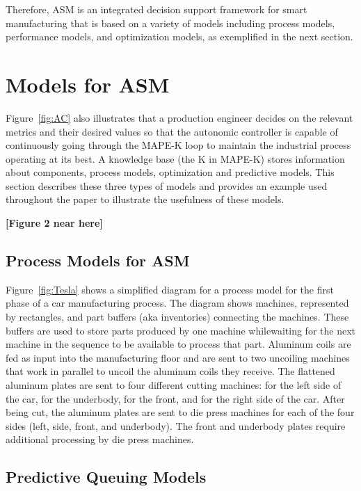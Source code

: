 \documentclass[a4paper, 12pt]{article} %
\begin{document}
Therefore, ASM is an integrated decision support framework for smart manufacturing that is based on a variety of models including process models, performance models, and optimization models, as exemplified in the next section.


\section{Models for ASM} \label{sec:models}

Figure~\ref{fig:AC} also illustrates that a production engineer decides on the relevant metrics and their desired values so that the autonomic controller is capable of continuously going through the MAPE-K loop to maintain the industrial process operating at its best. A knowledge base (the K in MAPE-K) stores information about components, process models, optimization and predictive models. This section describes these three types of models and provides an example used throughout the paper to illustrate the usefulness of these models.

{\bf [Figure 2 near here]}

\subsection{Process Models for ASM} \label{sec:proc}

Figure~\ref{fig:Tesla} shows a simplified diagram for a process model for the first phase of a car manufacturing process. The diagram shows machines, represented by rectangles, and part buffers (aka inventories)  connecting
the machines. These buffers are used to store parts produced by one machine whilewaiting for the next machine in the sequence to be available to process that part. Aluminum coils are fed as input into the manufacturing floor and are sent to two uncoiling machines that work in parallel to uncoil the aluminum coils they receive. The flattened aluminum plates are sent to four different cutting machines: for the left side of the car, for the underbody, for the front, and for the right side of the car. After being cut, the aluminum plates are sent to die press machines for each of the four sides (left, side, front, and underbody). The front and underbody plates require additional processing by die press machines.


\subsection{Predictive Queuing Models} \label{sec:pred}
\end{document}
